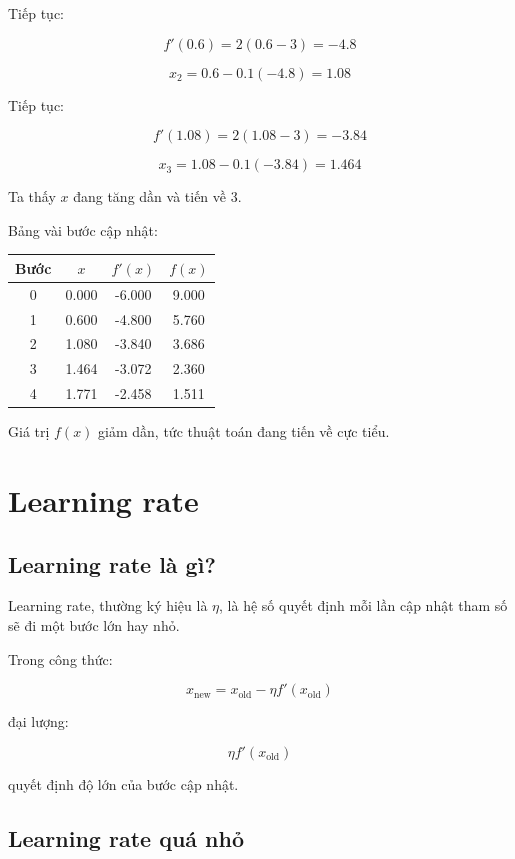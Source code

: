 \documentclass[12pt,a4paper]{report}
\begin{document}
Tiếp tục:

\[
    f'(0.6)=2(0.6-3)=-4.8
\]

\[
    x_2=0.6-0.1(-4.8)=1.08
\]

Tiếp tục:

\[
    f'(1.08)=2(1.08-3)=-3.84
\]

\[
    x_3=1.08-0.1(-3.84)=1.464
\]

Ta thấy $x$ đang tăng dần và tiến về 3.

\begin{vidu}
Bảng vài bước cập nhật:

\begin{center}
\begin{tabular}{cccc}
\toprule
Bước & $x$ & $f'(x)$ & $f(x)$ \\
\midrule
0 & 0.000 & -6.000 & 9.000 \\
1 & 0.600 & -4.800 & 5.760 \\
2 & 1.080 & -3.840 & 3.686 \\
3 & 1.464 & -3.072 & 2.360 \\
4 & 1.771 & -2.458 & 1.511 \\
\bottomrule
\end{tabular}
\end{center}

Giá trị $f(x)$ giảm dần, tức thuật toán đang tiến về cực tiểu.
\end{vidu}

\chapter{Learning rate}

\section{Learning rate là gì?}

Learning rate, thường ký hiệu là $\eta$, là hệ số quyết định mỗi lần cập nhật tham số sẽ đi một bước lớn hay nhỏ.

Trong công thức:

\[
    x_{\text{new}}
    =
    x_{\text{old}}
    -
    \eta f'(x_{\text{old}})
\]

đại lượng:

\[
    \eta f'(x_{\text{old}})
\]

quyết định độ lớn của bước cập nhật.

\section{Learning rate quá nhỏ}
\end{document}
